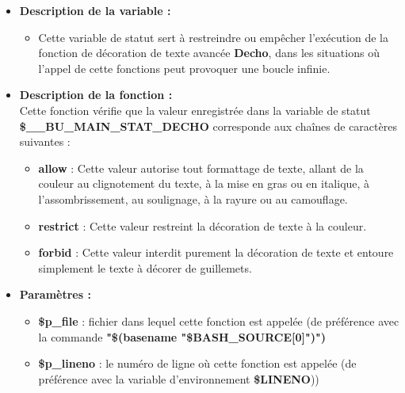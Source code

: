 \documentclass[a4paper,10pt]{article}
\begin{document}
\begin{itemize}
    \item \textbf{Description de la variable :}
    \begin{itemize}
        \item Cette variable de statut sert à restreindre ou empêcher l'exécution de la fonction de décoration de texte avancée \textbf{\color{mauve}Decho}, dans les situations où l'appel de cette fonctions peut provoquer une boucle infinie.\\[1\baselineskip]
    \end{itemize}


    \item \textbf{Description de la fonction :}\\
        Cette fonction vérifie que la valeur enregistrée dans la variable de statut\\
        \textbf{\color{orange}\$\_\_BU\_MAIN\_STAT\_DECHO} corresponde aux chaînes de caractères suivantes :\\[1\baselineskip]
        \begin{itemize}
            \item \textbf{allow} : Cette valeur autorise tout formattage de texte, allant de la couleur au clignotement du texte, à la mise en gras ou en italique, à l'assombrissement, au soulignage, à la rayure ou au camouflage.\\[1\baselineskip]

            \item \textbf{restrict} : Cette valeur restreint la décoration de texte à la couleur.\\[1\baselineskip]

            \item \textbf{forbid} : Cette valeur interdit purement la décoration de texte et entoure simplement le texte à décorer de guillemets.\\[1\baselineskip]
        \end{itemize}

    \item \textbf{Paramètres :}
    \begin{itemize}
        \item \color{orange}\textbf{\$p\_file}\color{white} : fichier dans lequel cette fonction est appelée (de préférence avec la commande \textbf{"\$(\color{gray}basename \color{white}"\color{orange}\$BASH\_SOURCE[0]\color{white}")")}\\[1\baselineskip]

        \item \color{orange}\textbf{\$p\_lineno}\color{white} : le numéro de ligne où cette fonction est appelée (de préférence avec la variable d'environnement \textbf{\color{orange}\$LINENO}))\\[1\baselineskip]
    \end{itemize}


\end{itemize}
\end{document}
